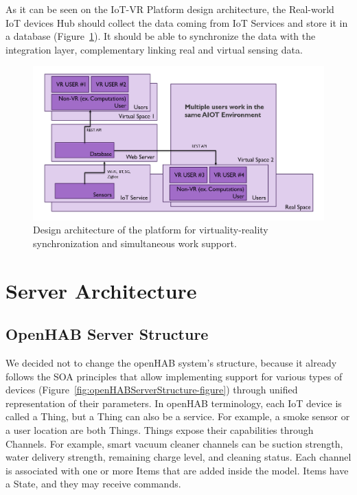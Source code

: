 As it can be seen on the IoT-VR Platform design architecture, the Real-world IoT devices Hub should collect the data coming from IoT Services and store it in a database (Figure~\ref{fig:StructureVersion2-figure}). It should be able to synchronize the data with the integration layer, complementary linking real and virtual sensing data.

\begin{figure}
  \centering
  \includegraphics[width=0.9\linewidth]{figures/StructureVersion2.png}
  \caption{Design architecture of the platform for virtuality-reality synchronization and simultaneous work support.}
  \label{fig:StructureVersion2-figure}
\end{figure}

\section{Server Architecture}

\subsection{OpenHAB Server Structure}

We decided not to change the openHAB system's structure, because it already follows the SOA principles that allow implementing support for various types of devices (Figure~\ref{fig:openHABServerStructure-figure}) through unified representation of their parameters. In openHAB terminology, each IoT device is called a Thing, but a Thing can also be a service. For example, a smoke sensor or a user location are both Things. Things expose their capabilities through Channels. For example, smart vacuum cleaner channels can be suction strength, water delivery strength, remaining charge level, and cleaning status. Each channel is associated with one or more Items that are added inside the model. Items have a State, and they may receive commands. 

